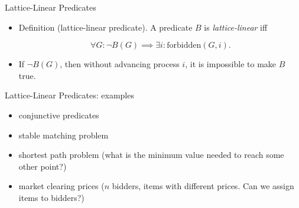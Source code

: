 \documentclass{beamer}
\begin{document}
\begin{frame}{Lattice-Linear Predicates}
\begin{itemize}
    \item Definition (lattice-linear predicate). A predicate $B$ is
    \emph{lattice-linear} iff
    
    $$\forall G : \neg B(G) \implies \exists i : \mathrm{forbidden}(G, i).$$
    
    \item If $\neg B(G)$, then without advancing process $i$, it is
    impossible to make $B$ true.
\end{itemize}
    
\end{frame}

\begin{frame}{Lattice-Linear Predicates: examples}
    \begin{itemize}
        \item conjunctive predicates
        \item stable matching problem
        \item shortest path problem (what is the minimum value needed
        to reach some other point?)
        \item market clearing prices ($n$ bidders, items with
        different prices. Can we assign items to bidders?)
    \end{itemize}
\end{frame}
\end{document}
